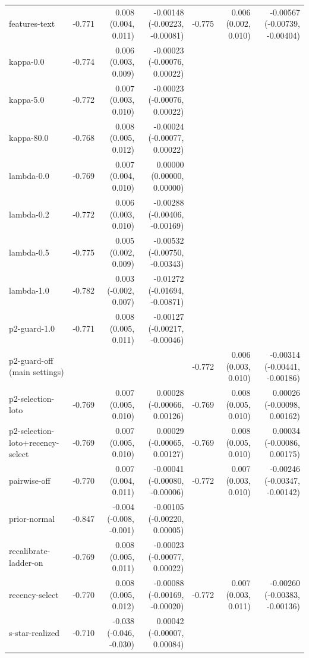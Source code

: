 \begin{tabular}{lrrrrrr}
features-text & -0.771 & 0.008 (0.004, 0.011) & -0.00148 (-0.00223, -0.00081) & -0.775 & 0.006 (0.002, 0.010) & -0.00567 (-0.00739, -0.00404) \\
kappa-0.0 & -0.774 & 0.006 (0.003, 0.009) & -0.00023 (-0.00076, 0.00022) &  &  &  \\
kappa-5.0 & -0.772 & 0.007 (0.003, 0.010) & -0.00023 (-0.00076, 0.00022) &  &  &  \\
kappa-80.0 & -0.768 & 0.008 (0.005, 0.012) & -0.00024 (-0.00077, 0.00022) &  &  &  \\
lambda-0.0 & -0.769 & 0.007 (0.004, 0.010) & 0.00000 (0.00000, 0.00000) &  &  &  \\
lambda-0.2 & -0.772 & 0.006 (0.003, 0.010) & -0.00288 (-0.00406, -0.00169) &  &  &  \\
lambda-0.5 & -0.775 & 0.005 (0.002, 0.009) & -0.00532 (-0.00750, -0.00343) &  &  &  \\
lambda-1.0 & -0.782 & 0.003 (-0.002, 0.007) & -0.01272 (-0.01694, -0.00871) &  &  &  \\
p2-guard-1.0 & -0.771 & 0.008 (0.005, 0.011) & -0.00127 (-0.00217, -0.00046) &  &  &  \\
p2-guard-off (main settings) &  &  &  & -0.772 & 0.006 (0.003, 0.010) & -0.00314 (-0.00441, -0.00186) \\
p2-selection-loto & -0.769 & 0.007 (0.005, 0.010) & 0.00028 (-0.00066, 0.00126) & -0.769 & 0.008 (0.005, 0.010) & 0.00026 (-0.00098, 0.00162) \\
p2-selection-loto+recency-select & -0.769 & 0.007 (0.005, 0.010) & 0.00029 (-0.00065, 0.00127) & -0.769 & 0.008 (0.005, 0.010) & 0.00034 (-0.00086, 0.00175) \\
pairwise-off & -0.770 & 0.007 (0.004, 0.011) & -0.00041 (-0.00080, -0.00006) & -0.772 & 0.007 (0.003, 0.010) & -0.00246 (-0.00347, -0.00142) \\
prior-normal & -0.847 & -0.004 (-0.008, -0.001) & -0.00105 (-0.00220, 0.00005) &  &  &  \\
recalibrate-ladder-on & -0.769 & 0.008 (0.005, 0.011) & -0.00023 (-0.00077, 0.00022) &  &  &  \\
recency-select & -0.770 & 0.008 (0.005, 0.012) & -0.00088 (-0.00169, -0.00020) & -0.772 & 0.007 (0.003, 0.011) & -0.00260 (-0.00383, -0.00136) \\
s-star-realized & -0.710 & -0.038 (-0.046, -0.030) & 0.00042 (-0.00007, 0.00084) &  &  &  \\
\bottomrule
\end{tabular}
